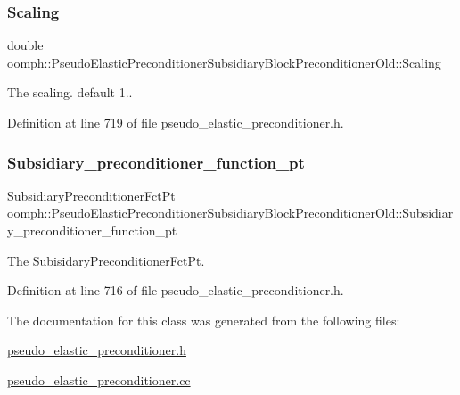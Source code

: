 \subsubsection{\texorpdfstring{Scaling}{Scaling}}
{\footnotesize\ttfamily double oomph\+::\+Pseudo\+Elastic\+Preconditioner\+Subsidiary\+Block\+Preconditioner\+Old\+::\+Scaling\hspace{0.3cm}{\ttfamily [private]}}



The scaling. default 1.. 



Definition at line 719 of file pseudo\+\_\+elastic\+\_\+preconditioner.\+h.

\mbox{\label{classoomph_1_1PseudoElasticPreconditionerSubsidiaryBlockPreconditionerOld_a376d5fd2ddf9f367854b41478a269ae2}} 
\subsubsection{\texorpdfstring{Subsidiary\+\_\+preconditioner\+\_\+function\+\_\+pt}{Subsidiary\_preconditioner\_function\_pt}}
{\footnotesize\ttfamily \hyperlink{classoomph_1_1PseudoElasticPreconditionerSubsidiaryBlockPreconditionerOld_a85f57923e70244d5fde0538946eb8c3d}{Subsidiary\+Preconditioner\+Fct\+Pt} oomph\+::\+Pseudo\+Elastic\+Preconditioner\+Subsidiary\+Block\+Preconditioner\+Old\+::\+Subsidiary\+\_\+preconditioner\+\_\+function\+\_\+pt\hspace{0.3cm}{\ttfamily [private]}}



The Subisidary\+Preconditioner\+Fct\+Pt. 



Definition at line 716 of file pseudo\+\_\+elastic\+\_\+preconditioner.\+h.



The documentation for this class was generated from the following files\+:\begin{DoxyCompactItemize}
\item 
\hyperlink{pseudo__elastic__preconditioner_8h}{pseudo\+\_\+elastic\+\_\+preconditioner.\+h}\item 
\hyperlink{pseudo__elastic__preconditioner_8cc}{pseudo\+\_\+elastic\+\_\+preconditioner.\+cc}\end{DoxyCompactItemize}
